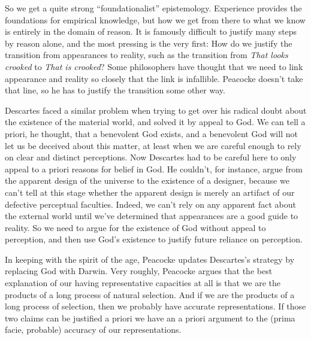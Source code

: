 \documentclass[
  11pt,
  letterpaper,
  DIV=11,
  numbers=noendperiod,
  twoside]{scrartcl}
\begin{document}
So we get a quite strong ``foundationalist'' epistemology. Experience
provides the foundations for empirical knowledge, but how we get from
there to what we know is entirely in the domain of reason. It is
famously difficult to justify many steps by reason alone, and the most
pressing is the very first: How do we justify the transition from
appearances to reality, such as the transition from \emph{That looks
crooked} to \emph{That is crooked}? Some philosophers have thought that
we need to link appearance and reality so closely that the link is
infallible. Peacocke doesn't take that line, so he has to justify the
transition some other way.

Descartes faced a similar problem when trying to get over his radical
doubt about the existence of the material world, and solved it by appeal
to God. We can tell a priori, he thought, that a benevolent God exists,
and a benevolent God will not let us be deceived about this matter, at
least when we are careful enough to rely on clear and distinct
perceptions. Now Descartes had to be careful here to only appeal to a
priori reasons for belief in God. He couldn't, for instance, argue from
the apparent design of the universe to the existence of a designer,
because we can't tell at this stage whether the apparent design is
merely an artifact of our defective perceptual faculties. Indeed, we
can't rely on any apparent fact about the external world until we've
determined that appearances are a good guide to reality. So we need to
argue for the existence of God without appeal to perception, and then
use God's existence to justify future reliance on perception.

In keeping with the spirit of the age, Peacocke updates Descartes's
strategy by replacing God with Darwin. Very roughly, Peacocke argues
that the best explanation of our having representative capacities at all
is that we are the products of a long process of natural selection. And
if we are the products of a long process of selection, then we probably
have accurate representations. If those two claims can be justified a
priori we have an a priori argument to the (prima facie, probable)
accuracy of our representations.
\end{document}
